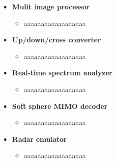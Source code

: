 
\begin{itemize}
	\item \textbf{Mulit image processor}
	      \begin{itemize}
		      \item aaaaaaaaaaaaaaaaaa
	      \end{itemize}
	\item \textbf{Up/down/cross converter}
	      \begin{itemize}
		      \item aaaaaaaaaaaaaaaaaa
	      \end{itemize}
	\item \textbf{Real-time spectrum analyzer}
	      \begin{itemize}
		      \item aaaaaaaaaaaaaaaaaa
	      \end{itemize}
	\item \textbf{Soft sphere MIMO decoder}
	      \begin{itemize}
		      \item aaaaaaaaaaaaaaaaaa
	      \end{itemize}
	\item \textbf{Radar emulator}
	      \begin{itemize}
		      \item aaaaaaaaaaaaaaaaaa
	      \end{itemize}
\end{itemize}